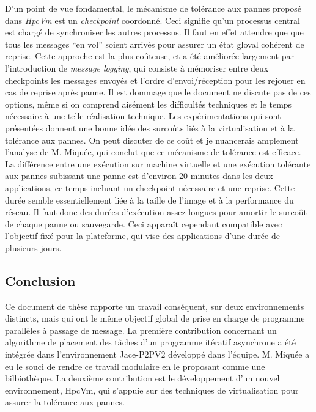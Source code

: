 \documentclass[a4paper,12pt]{article}
\begin{document}
D'un point de vue fondamental, le mécanisme de tolérance aux pannes
proposé dans \textit{HpcVm} est un \emph{checkpoint} coordonné. Ceci
signifie qu'un processus central est chargé de synchroniser les
autres processus. Il faut en effet attendre que que tous les messages
``en vol'' soient arrivés pour assurer un état gloval cohérent de reprise.
Cette approche est la plus coûteuse, et a été améliorée largement
par l'introduction de \emph{message logging}, qui consiste à
mémoriser entre deux checkpoints les messages envoyés et l'ordre
d'envoi/réception pour les rejouer en cas de reprise après panne. 
Il est dommage que le document ne discute pas de ces options, même
si on comprend aisément les difficultés techniques et le temps nécessaire
à une telle réalisation technique. 
Les expérimentations qui sont présentées donnent une bonne idée des surcoûts
liés à la virtualisation et à la tolérance aux pannes. On peut discuter 
de ce coût et je nuancerais amplement l'analyse de M. Miquée, qui conclut
que ce mécanisme de tolérance est efficace. La différence entre une
exécution sur machine virtuelle et une exécution tolérante aux pannes
subissant une panne est d'environ 20 minutes dans les deux applications,
ce temps incluant un checkpoint nécessaire et une reprise.
Cette durée semble essentiellement liée à la taille de l'image et à la 
performance du réseau. Il faut donc des durées d'exécution assez longues 
pour amortir le surcoût de chaque panne ou sauvegarde. Ceci apparaît
cependant compatible avec l'objectif fixé pour la plateforme, qui vise 
des applications d'une durée de plusieurs jours.



\subsection*{Conclusion}
\vspace{-3mm}
Ce document de thèse rapporte un travail conséquent, sur deux environnements
distincts, mais qui ont le même objectif global de prise en charge de programme
parallèles à passage de message. La première contribution concernant un 
algorithme de placement des tâches d'un programme itératif asynchrone a été 
intégrée dans l'environnement Jace-P2PV2 développé dans l'équipe. M. Miquée
a eu le souci de rendre ce travail modulaire en le proposant comme une
bilbiothèque. La deuxième contribution est le développement d'un nouvel
environnement, HpcVm, qui s'appuie sur des techniques de virtualisation
pour assurer la tolérance aux pannes. 
\end{document}
